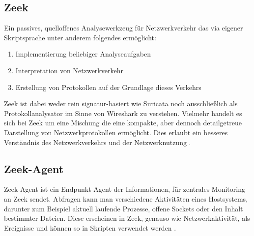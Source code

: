 \subsection{Zeek}
Ein passives, quelloffenes Analysewerkzeug für Netzwerkverkehr das via eigener  Skriptsprache unter anderem folgendes ermöglicht:
\begin{enumerate}
\item{Implementierung beliebiger Analyseaufgaben}
\item{Interpretation von Netzwerkverkehr}
\item{Erstellung von Protokollen auf der Grundlage dieses Verkehrs}
\end{enumerate}
Zeek ist dabei weder rein signatur-basiert wie Suricata noch ausschließlich als Protokollanalysator im Sinne von Wireshark zu verstehen. Vielmehr handelt es sich bei Zeek um eine Mischung die eine kompakte, aber dennoch detailgetreue Darstellung von Netzwerkprotokollen ermöglicht. Dies erlaubt ein besseres Verständnis des Netzwerkverkehrs und der Netzwerknutzung \cite{zeek_about_page}.

\subsection{Zeek-Agent}
Zeek-Agent ist ein Endpunkt-Agent der Informationen, für zentrales Monitoring an Zeek sendet.
Abfragen kann man verschiedene Aktivitäten eines Hostsystems, darunter zum Beispiel aktuell laufende Prozesse, offene Sockets oder den Inhalt bestimmter Dateien. Diese erscheinen in Zeek, genauso wie Netzwerkaktivität, als Ereignisse und können so in Skripten verwendet werden \cite{zeek_agent}.

